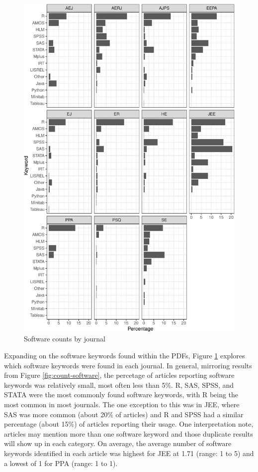 \documentclass[english,,man]{apa6}
\theoremstyle{definition}
\theoremstyle{definition}
\theoremstyle{definition}
\theoremstyle{remark}
\begin{document}
\begin{figure}
\centering
\includegraphics{software_files/figure-latex/software-journal-1.pdf}
\caption{\label{fig:software-journal}Software counts by journal}
\end{figure}

Expanding on the software keywords found within the PDFs, Figure
\ref{fig:software-journal} explores which software keywords were found
in each journal. In general, mirroring results from Figure
\ref{fig:count-software}, the percetage of articles reporting software
keywords was relatively small, most often less than 5\%. R, SAS, SPSS,
and STATA were the most commonly found software keywords, with R being
the most common in most journals. The one exception to this was in JEE,
where SAS was more common (about 20\% of articles) and R and SPSS had a
similar percentage (about 15\%) of articles reporting their usage. One
interpretation note, articles may mention more than one software keyword
and those duplicate results will show up in each category. On average,
the average number of software keywords identified in each article was
highest for JEE at 1.71 (range: 1 to 5) and a lowest of 1 for PPA
(range: 1 to 1).
\end{document}
